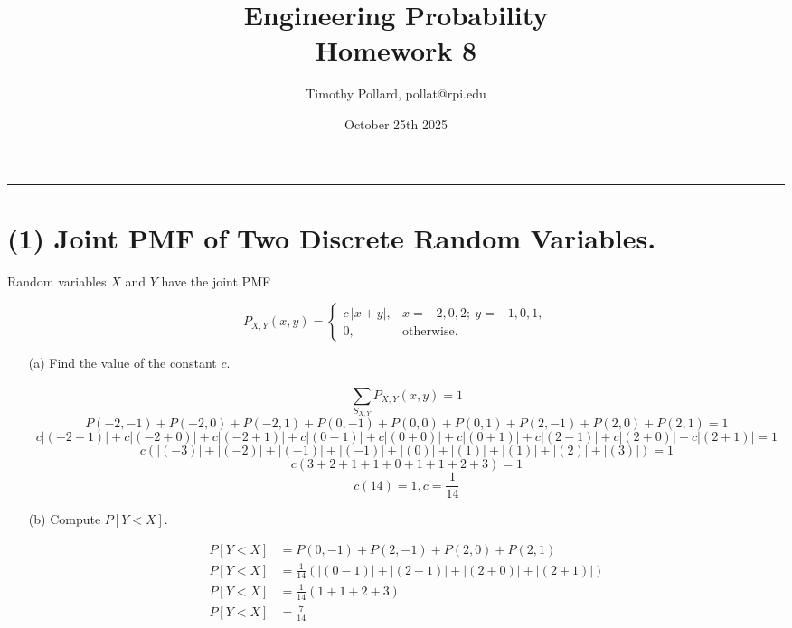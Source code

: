 \documentclass[12pt]{article}
\title{Engineering Probability \\ Homework 8}
\author{Timothy Pollard, pollat@rpi.edu}
\date{October 25th 2025}
\newenvironment{bluetext}
    {\par\begingroup\color{blue}\parindent=0pt\ignorespaces}
    {\par\endgroup\noindent\ignorespacesafterend}
\begin{document}
\maketitle
\hrule
\section*{(1) Joint PMF of Two Discrete Random Variables.}

Random variables $X$ and $Y$ have the joint PMF

\[
P_{X,Y}(x,y) =
\begin{cases}
c\,|x+y|, & x = -2, 0, 2;~ y = -1, 0, 1, \\
0, & \text{otherwise.}
\end{cases}
\]

\begin{enumerate}
    \item[(a)] Find the value of the constant $c$.
    \begin{bluetext}
        \[\sum_{S_{X,Y}}^{}P_{X,Y}(x,y)=1\]
    \[P(-2,-1)+ P(-2,0)+ P(-2,1)+ 
     P(0,-1)+ P(0,0)+ P(0,1) +
     P(2,-1)+ P(2,0)+ P(2,1)=1 \]
     \[c|(-2-1)|+ c|(-2+0)|+ c|(-2+1)|+ 
     c|(0-1)|+ c|(0+0)|+ c|(0+1)| +
     c|(2-1)|+ c|(2+0)|+ c|(2+1)|=1 \]
     \[c\left(|(-3)|+ |(-2)|+ |(-1)|+ 
     |(-1)|+ |(0)|+ |(1)| +
     |(1)|+ |(2)|+ |(3)|\right)=1 \]
     \[c\left(3+ 2+ 1+ 
     1+ 0+ 1 +
     1+ 2+ 3\right)=1 \]
     \[c\left(14\right)=1, c=\frac{1}{14} \]
    \end{bluetext}
    \item[(b)] Compute $P[Y < X]$.
    \begin{bluetext}
        \[
        \begin{aligned}
            P[Y<X]&=P(0,-1)+P(2,-1)+P(2,0)+P(2,1)\\
            P[Y<X]&= \frac{1}{14}\left(|(0-1)|+|(2-1)|+|(2+0)|+|(2+1)|\right)\\
            P[Y<X]&= \frac{1}{14}\left(1+1+2+3\right)\\
            P[Y<X]&=\frac{7}{14}\\
        \end{aligned}
        \]
    \end{bluetext}

\end{enumerate}
\end{document}
